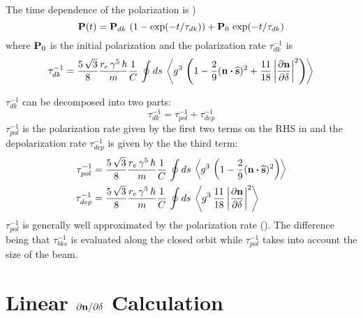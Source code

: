 The time dependence of the polarization is \cite{b:barber99})
\begin{equation}
  {\bf P}(t) = {\bf P}_{dk} \, \left( 1 - \exp(-t/\tau_{dk}) \right) + {\bf P}_0 \, \exp(-t/\tau_{dk})
\end{equation}
where ${\bf P}_0$ is the initial polarization and the polarization rate $\tau_{dk}^{-1}$ is 
\begin{equation}
  \tau_{dk}^{-1} = \frac{5 \, \sqrt{3}}{8} \frac{r_e \, \gamma^5 \, \hbar}{m}
  \frac{1}{C} \, \oint ds \, \left< g^3 \, \left( 1 - \frac{2}{9} ({\bf n} \mathbin{\boldsymbol{\cdot}} \widehat{{\bf s}})^2 + 
  \frac{11}{18} \left| \frac{\partial {\bf n}}{\partial \delta} \right|^2 \right) \right>
  \label{t583}
\end{equation}

$\tau_{dk}^{-1}$ can be decomposed into two parts:
\begin{equation}
  \tau_{dk}^{-1} = \tau_{pol}^{-1} + \tau_{dep}^{-1}
  \label{tdk}
\end{equation}
$\tau_{pol}^{-1}$ is the polarization rate given by the first two terms on the
RHS in  and the depolarization rate $\tau_{dep}^{-1}$ is given by the the third term:
\begin{align}
  \tau_{pol}^{-1} &= \frac{5 \, \sqrt{3}}{8} \frac{r_e \, \gamma^5 \, \hbar}{m} \frac{1}{C} \,
    \oint ds \, \left< g^3 \, \left( 1 - \frac{2}{9} ({\bf n} \mathbin{\boldsymbol{\cdot}} \widehat{{\bf s}})^2 \right) \right> 
    \nonumber \\
  \tau_{dep}^{-1} &= \frac{5 \, \sqrt{3}}{8} \frac{r_e \, \gamma^5 \, \hbar}{m}
    \frac{1}{C} \, \oint ds \, \left< g^3 \,
    \frac{11}{18} \left| \frac{\partial {\bf n}}{\partial \delta} \right|^2 \right>
    \label{tdep}
\end{align}
$\tau_{pol}^{-1}$ is generally well approximated by the  polarization
rate (). The difference being that $\tau_{bks}^{-1}$ is evaluated along the closed orbit
while $\tau_{pol}^{-1}$ takes into account the size of the beam.

\section{Linear \texorpdfstring{$\partial{\bf n}/\partial\delta$}{dn/dpz} Calculation}
\label{s:dn.calc}

